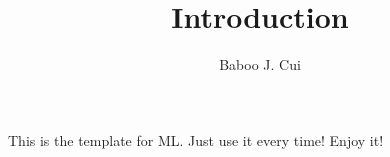 \documentclass[10pt,a4paper,oneside]{article}
\author{Baboo J. Cui}
\begin{document}
\title{Introduction}
\maketitle

This is the template for ML. Just use it every time! Enjoy it!
\end{document}
